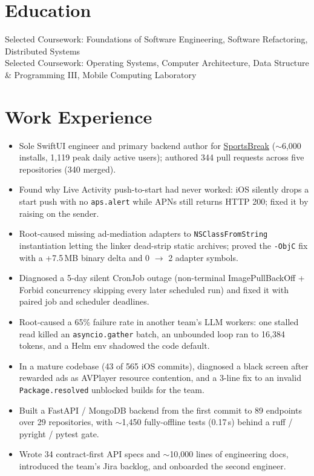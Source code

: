 \documentclass[11pt, letterpaper]{article}
\begin{document}

\section{Education}
Selected Coursework: Foundations of Software Engineering, Software Refactoring, Distributed Systems\\[1pt]
Selected Coursework: Operating Systems, Computer Architecture, Data Structure \& Programming III, Mobile Computing Laboratory

\section{Work Experience}
\begin{itemize}
  \item Sole SwiftUI engineer and primary backend author for \href{https://apps.apple.com/app/id6762649287}{SportsBreak} ($\sim$6{,}000 installs, 1{,}119 peak daily active users); authored 344 pull requests across five repositories (340 merged).
  \item Found why Live Activity push-to-start had never worked: iOS silently drops a start push with no \texttt{aps.alert} while APNs still returns HTTP 200; fixed it by raising on the sender.
  \item Root-caused missing ad-mediation adapters to \texttt{NSClassFromString} instantiation letting the linker dead-strip static archives; proved the \texttt{-ObjC} fix with a +7.5\,MB binary delta and 0 $\to$ 2 adapter symbols.
  \item Diagnosed a 5-day silent CronJob outage (non-terminal ImagePullBackOff + Forbid concurrency skipping every later scheduled run) and fixed it with paired job and scheduler deadlines.
  \item Root-caused a 65\% failure rate in another team's LLM workers: one stalled read killed an \texttt{asyncio.gather} batch, an unbounded loop ran to 16{,}384 tokens, and a Helm env shadowed the code default.
  \item In a mature codebase (43 of 565 iOS commits), diagnosed a black screen after rewarded ads as AVPlayer resource contention, and a 3-line fix to an invalid \texttt{Package.resolved} unblocked builds for the team.
  \item Built a FastAPI / MongoDB backend from the first commit to 89 endpoints over 29 repositories, with $\sim$1{,}450 fully-offline tests (0.17\,s) behind a ruff / pyright / pytest gate.
  \item Wrote 34 contract-first API specs and $\sim$10{,}000 lines of engineering docs, introduced the team's Jira backlog, and onboarded the second engineer.
\end{itemize}
\end{document}

